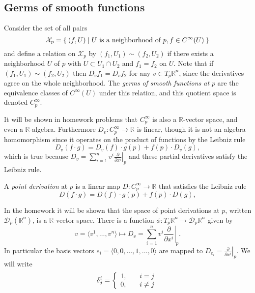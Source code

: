\subsection{Germs of smooth functions}

\begin{defn}[Germs]
Consider the set of all pairs
$$
  \mathcal{X}_p
= \Set{ (f, U)
  |     U \text{ is a neighborhood of } p,
        f \in C^\infty (U)
  }
$$
and define a relation on $\mathcal{X}_p$ by
$(f_1, U_1) \sim (f_2, U_2)$ if there exists a neighborhood $U$ of $p$
with $U \subset U_1 \cap U_2$ and $f_1 = f_2$ on $U$. Note that if
$(f_1, U_1) \sim (f_2, U_2)$ then $D_v f_1 = D_v f_2$ for any
$v \in T_p \mathbb{R}^n$, since the derivatives agree on the whole
neighborhood. The \emph{germs of smooth functions at $p$} are the
equivalence classes of $C^\infty(U)$ under this relation, and this
quotient space is denoted $C_p^\infty$.
\end{defn}

It will be shown in homework problems that $C_p^\infty$ is also a
$\mathbb{R}$-vector space, and even a
$\mathbb{R}$-algebra. Furthermore $D_v : C_p^\infty \to \mathbb{R}$ is
linear, though it is not an algebra homomorphism since it operates on
the product of functions by the Leibniz rule
$$
  D_v (f \cdot g)
= D_v (f) \cdot g(p)
+ f(p) \cdot D_v (g),
$$
which is true because
$  D_v
 = \sum_{i=1}^n
     v^i
     \left.
       \frac{\partial}{\partial x^i}
     \right|_p
$ and these partial derivatives satisfy the Leibniz rule.

\begin{defn}[Derivation]
A \emph{point derivation} at $p$ is a linear map
$D : C_p^\infty \to \mathbb{R}$ that satisfies the Leibniz rule
$$
D (f \cdot g) = D(f) \cdot g(p) + f(p) \cdot D(g),
$$
\end{defn}

In the homework it will be shown that the space of point derivations
at $p$, written $\mathcal{D}_p(\mathbb{R}^n)$, is a
$\mathbb{R}$-vector space. There is a function
$\phi: T_p \mathbb{R}^n \to \mathcal{D}_p \mathbb{R}^n$ given by
$$
        v
      = \langle v^1, \dots, v^n \rangle
\mapsto D_v
      = \sum_{i=1}^n
          v^i
          \left. \frac{\partial}{\partial x^i}\right|_p.
$$
In particular the basis vectors
$e_i = \langle 0, 0, \dots, 1, \dots, 0 \rangle$ are mapped to
$D_{e_i} = \left.\frac{\partial}{\partial x^i}\right|_p$. We will
write
$$
  \delta^i_j
= \left\{
    \begin{array}{l c}
      1, & \quad i = j \\
      0, & \quad i \neq j
    \end{array}
  \right.
$$

